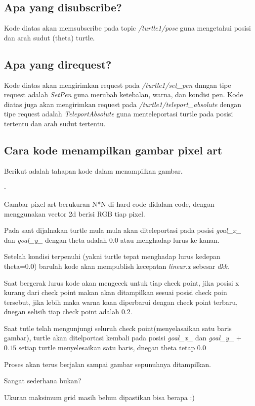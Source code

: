 \documentclass{article}
\newenvironment{info}
{
    \begin{mdframed}[
        linewidth=2pt,
        linecolor=info_color,
        backgroundcolor=white
    ]
}
{
    \end{mdframed}
}
\begin{document}
\subsection{Apa yang disubscribe?}

Kode diatas akan memsubscribe pada topic \textit{/turtle1/pose} guna 
mengetahui posisi dan arah sudut (theta) turtle.
\subsection{Apa yang direquest?}
Kode diatas akan mengirimkan request pada \textit{/turtle1/set\_pen} dnngan 
tipe request adalah \textit{SetPen} guna merubah ketebalan, warna, dan kondisi pen. Kode diatas juga akan mengirimkan request pada \textit{/turtle1/teleport\_absolute} 
dengan tipe request adalah \textit{TeleportAbsolute} guna menteleportasi 
turtle pada posisi tertentu dan arah sudut tertentu.

\subsection{Cara kode menampilkan gambar pixel art}
Berikut adalah tahapan kode dalam menampilkan gambar.
\begin{list}{-}{}
    \item Gambar pixel art berukuran N*N di hard code didalam code, dengan menggunakan vector 2d berisi RGB tiap pixel.
    \item Pada saat dijalnakan turtle mula mula akan diteleportasi pada posisi \textit{goal\_x\_} dan \textit{goal\_y\_} dengan theta adalah $0.0$ atau menghadap lurus ke-kanan.
    \item Setelah kondisi terpenuhi (yakni turtle tepat menghadap lurus kedepan theta=0.0) barulah kode akan mempublish kecepatan \textit{linear.x} sebesar \textit{dkk}.
    \item Saat bergerak lurus kode akan mengecek untuk tiap check point, jika posisi x kurang dari check point makan akan ditampilkan sesuai posisi check poin tersebut, jika lebih maka warna kaan diperbarui dengan check point terbaru, dnegan selisih tiap check point adalah $0.2$.
    \item Saat tutle telah mengunjungi seluruh check point(menyelasaikan satu baris gambar), turtle akan ditelportasi kembali pada posisi \textit{goal\_x\_} dan \textit{goal\_y\_ }+$0.15$ setiap turtle menyelesaikan satu baris, dnegan theta tetap $0.0$
    \item Proses akan terus berjalan sampai gambar sepunuhnya ditampilkan.
\end{list}
Sangat sederhana bukan?
\begin{info}
Ukuran maksimum grid masih belum dipastikan bisa berapa :)
\end{info}
\end{document}
